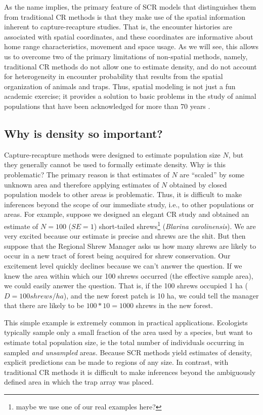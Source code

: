 As the name implies, the primary feature of SCR models that
distinguishes them from traditional CR methods is that they make use
of the spatial information inherent to capture-recapture studies. That
is, the encounter histories are associated with spatial coordinates,
and these coordinates are informative about home range
characteristics, movement and space usage.
As we will see, this allows us to overcome two of the
primary limitations of non-spatial methods, namely, traditional CR
methods do not allow one to estimate density, and do not account for
heterogeneity in encounter probability that results from the spatial
organization of animals and traps. Thus, spatial modeling is not just
a fun academic exercise; it provides a solution to basic problems in
the study of animal populations that have been acknowledged for more
than 70 years \citep{dice:1938}.

\subsection{Why is density so important? }

Capture-recapture methods were designed to estimate population size
$N$, but they generally cannot be used to
formally estimate density. Why is 
this problematic? 
The primary reason is that estimates of $N$ are ``scaled'' by some
unknown area and therefore applying estimates of $N$ obtained by
closed population models to other areas is problematic. Thus, it is
difficult to make 
inferences beyond the scope of our immediate study, i.e., to other
populations or areas. For example, suppose we designed an elegant
CR study and obtained an estimate of $N=100$ ($SE=1$) short-tailed
shrews\footnote{maybe we use one of our real examples here?} ({\it Blarina carolinensis}). We are very excited because our
estimate is precise and shrews are the shit. But then suppose that the
Regional Shrew Manager
asks us how many shrews are likely to occur in a new tract of
forest being acquired for shrew conservation. Our excitement level
quickly declines because we can't answer the question. If we knew the
area within which our 100 shrews occurred (the effective sample area),
we could easily answer the question. That is, if the 100 shrews
occupied 1 ha ($D=100 shrews/ha$), and the new forest patch is 10 ha,
we could tell the manager that there are likely to be $100*10 = 1000$
shrews in the new forest.

This simple example is extremely common in practical applications.
Ecologists typically sample only a small fraction of the area used by
a species, but want to estimate total population size, ie the total
number of individuals occurring in sampled {\it and unsampled}
areas. Because SCR methods yield estimates of density, explicit
predictions can be made to regions of any size.
In contrast, with
traditional CR methods it is difficult to make inferences beyond the
ambiguously defined area in which the trap array was placed.

